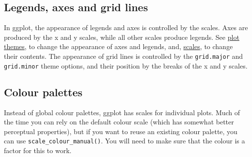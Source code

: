 \subsection{Legends, axes and grid lines}

In ggplot, the appearance of legends and axes is controlled by the
scales. Axes are produced by the x and y scales, while all other scales
produce legends. See \hyperref[sec:themes]{plot themes}, to change the
appearance of axes and legends, and, \hyperref[sec:guides]{scales}, to
change their contents. The appearance of grid lines is controlled by the
\texttt{grid.major} and \texttt{grid.minor} theme options, and their
position by the breaks of the x and y scales.

\subsection{Colour palettes}

Instead of global colour palettes, ggplot has scales for individual
plots. Much of the time you can rely on the default colour scale (which
has somewhat better perceptual properties), but if you want to reuse an
existing colour palette, you can use \texttt{scale\_colour\_manual()}.
You will need to make sure that the colour is a factor for this to work.

\begin{Shaded}
\begin{Highlighting}[]
\NormalTok{(}\NormalTok{(}\NormalTok{))}
\NormalTok{(}\NormalTok{:}\NormalTok{, }\NormalTok{:}\NormalTok{, } \NormalTok{:}\NormalTok{, } \NormalTok{, } \NormalTok{)}

\NormalTok{(}\NormalTok{:}\NormalTok{, }\NormalTok{:}\NormalTok{, } \NormalTok{(}\NormalTok{:}\NormalTok{), } \NormalTok{(}\NormalTok{))}
\NormalTok{() +}\StringTok{ }\NormalTok{(} \NormalTok{(}\NormalTok{))}
\end{Highlighting}
\end{Shaded}

